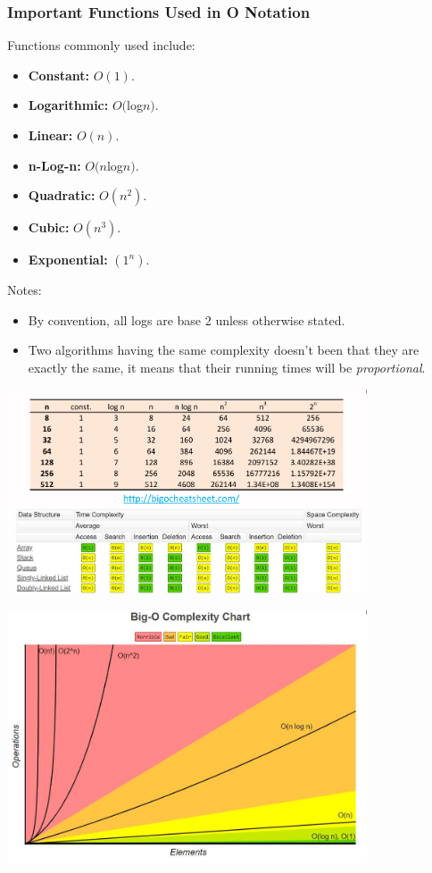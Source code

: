 \documentclass[11pt]{article}
\begin{document}
\subsubsection{Important Functions Used in O Notation} 
Functions commonly used include:
\begin{itemize}
    \item   \textbf{Constant:} $O(1)$. 
    \item   \textbf{Logarithmic:} $O($log$n)$.
    \item   \textbf{Linear:} $O(n)$. 
    \item   \textbf{n-Log-n:} $O(n$log$n)$. 
    \item   \textbf{Quadratic:} $O(n^2)$. 
    \item   \textbf{Cubic:} $O(n^3)$. 
    \item   \textbf{Exponential:} $(1^n)$. 
\end{itemize}

Notes:
\begin{itemize}
    \item   By convention, all logs are base 2 unless otherwise stated. 
    \item   Two algorithms having the same complexity doesn't been that they are exactly the same, it means that their 
            running times will be \textit{proportional}.
\end{itemize}


\begin{center}
    \includegraphics[width=0.8\textwidth]{comparisonoffunctions1.png}
\end{center}

\begin{center}
    \includegraphics[width=0.8\textwidth]{comparisonoffunctions2.png}
\end{center}
\end{document}
